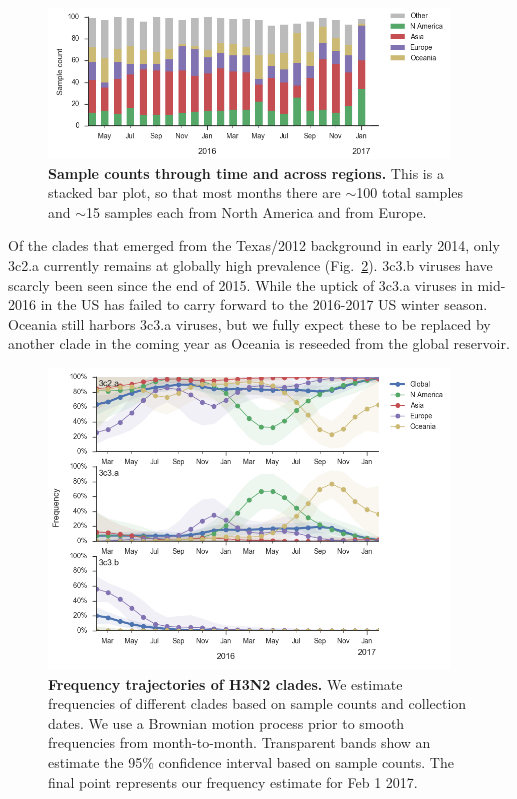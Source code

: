\documentclass[11pt,oneside,letterpaper]{article}
\begin{document}
\begin{figure}[H]
	\centering
	\includegraphics[width=0.95\textwidth]{../figures/feb-2017/H3N2_counts.png}
	\caption{\textbf{Sample counts through time and across regions.}
	This is a stacked bar plot, so that most months there are $\sim$100 total samples and $\sim$15 samples each from North America and from Europe.
	}
	\label{H3N2_counts}
\end{figure}

\pagebreak

Of the clades that emerged from the Texas/2012 background in early 2014, only 3c2.a currently remains at globally high prevalence (Fig.\ \ref{H3N2_clades}).
3c3.b viruses have scarcly been seen since the end of 2015.
While the uptick of 3c3.a viruses in mid-2016 in the US has failed to carry forward to the 2016-2017 US winter season.
Oceania still harbors 3c3.a viruses, but we fully expect these to be replaced by another clade in the coming year as Oceania is reseeded from the global reservoir.

\begin{figure}[H]
	\centering
	\includegraphics[width=0.95\textwidth]{../figures/feb-2017/H3N2_clades.png}
	\caption{\textbf{Frequency trajectories of H3N2 clades.}
	We estimate frequencies of different clades based on sample counts and collection dates.
	We use a Brownian motion process prior to smooth frequencies from month-to-month.
	Transparent bands show an estimate the 95\% confidence interval based on sample counts.
	The final point represents our frequency estimate for Feb 1 2017.
	}
	\label{H3N2_clades}
\end{figure}
\end{document}
